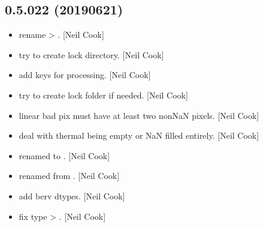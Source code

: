\documentclass[a4paper,10pt,english]{report}
\begin{document}
\subsection{0.5.022 (2019\sphinxhyphen{}06\sphinxhyphen{}21)}
\label{\detokenize{misc/changelog:id133}}\begin{itemize}
\item {} 
 \sphinxhyphen{} rename  \textendash{}\textgreater{} . {[}Neil Cook{]}

\item {} 
 \sphinxhyphen{} try to create lock directory. {[}Neil Cook{]}

\item {} 
 \sphinxhyphen{} add keys for processing. {[}Neil Cook{]}

\item {} 
 \sphinxhyphen{} try to create lock folder if needed. {[}Neil Cook{]}

\item {} 
 \sphinxhyphen{} linear bad pix must have at least two non\sphinxhyphen{}NaN pixels.
{[}Neil Cook{]}

\item {} 
 \sphinxhyphen{} deal with thermal being empty or NaN filled entirely.
{[}Neil Cook{]}

\item {} 
 \sphinxhyphen{} renamed  to . {[}Neil
Cook{]}

\item {} 
 \sphinxhyphen{} renamed from . {[}Neil Cook{]}

\item {} 
 \sphinxhyphen{} add berv dtypes. {[}Neil Cook{]}

\item {} 
 \sphinxhyphen{} fix type  \textendash{}\textgreater{} . {[}Neil
Cook{]}

\end{itemize}
\end{document}
